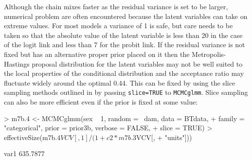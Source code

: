 \documentclass{article}
\begin{document}
Although the chain mixes faster as the residual variance is set to be larger, numerical problem are often encountered because the latent variables can take on extreme values. For most models a variance of 1 is safe, but care needs to be taken so that the absolute value of the latent variable is less than 20 in the case of the logit link and less than 7 for the probit link. If the residual variance is not fixed but has an alternative proper prior placed on it then the Metropolis-Hastings proposal distribution for the latent variables may not be well suited to the local properties of the conditional distribution and the acceptance ratio may fluctuate widely around the optimal 0.44. This can be fixed by using the slice sampling methods outlined in \citet{Damien.1999} by passing \texttt{slice=TRUE} to \texttt{MCMCglmm}. Slice sampling can also be more efficient even if the prior is fixed at some value: 
 
\begin{Schunk}
\begin{Sinput}
> m7b.4 <- MCMCglmm(sex ~ 1, random = ~dam, data = BTdata, 
+     family = "categorical", prior = prior3b, verbose = FALSE, 
+     slice = TRUE)
> effectiveSize(m7b.4$VCV[, 1]/(1 + c2 * m7b.3$VCV[, 
+     "units"]))
\end{Sinput}
\begin{Soutput}
    var1 
635.7877 
\end{Soutput}
\end{Schunk}

\ifalone
\end{document}
